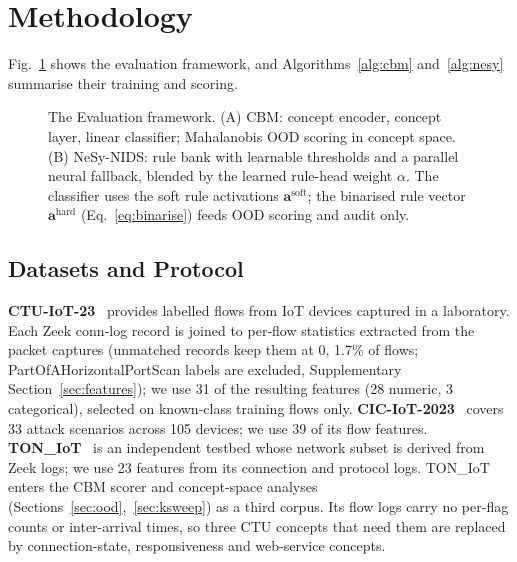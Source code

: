 \documentclass[journal]{IEEEtran}
\begin{document}
\section{Methodology}\label{sec:method}

Fig.~\ref{fig:arch} shows the evaluation framework, and Algorithms~\ref{alg:cbm} and~\ref{alg:nesy} summarise their training and scoring.

\begin{figure}[t]
    \centering
    \vspace{-1mm}
    \def\svgwidth{.85\textwidth}
    \fontsize{5}{5}\selectfont
    
    \vspace{-1mm}
    \caption{The Evaluation framework. (A) CBM: concept encoder, concept layer, linear classifier; Mahalanobis OOD scoring in concept space. (B) NeSy-NIDS: rule bank with learnable thresholds and a parallel neural fallback, blended by the learned rule-head weight $\alpha$. The classifier uses the soft rule activations $\mathbf{a}^{\mathrm{soft}}$; the binarised rule vector $\mathbf{a}^{\mathrm{hard}}$ (Eq.~\ref{eq:binarise}) feeds OOD scoring and audit only.}
    \label{fig:arch}
    \vspace{-2mm}
\end{figure}

\subsection{Datasets and Protocol}
\label{sec:datasets}

\textbf{CTU-IoT-23}~\cite{parmisano2020ctu} provides labelled flows from IoT devices captured in a laboratory. Each Zeek conn-log record is joined to per-flow statistics extracted from the packet captures (unmatched records keep them at 0, 1.7\% of flows; PartOfAHorizontalPortScan labels are excluded, Supplementary Section~\ref{sec:features}); we use 31 of the resulting features (28 numeric, 3 categorical), selected on known-class training flows only. \textbf{CIC-IoT-2023}~\cite{neto2023ciciot} covers 33 attack scenarios across 105 devices; we use 39 of its flow features. \textbf{TON\_IoT}~\cite{alsaedi2020toniot} is an independent testbed whose network subset is derived from Zeek logs; we use 23 features from its connection and protocol logs. TON\_IoT enters the CBM scorer and concept-space analyses (Sections~\ref{sec:ood},~\ref{sec:ksweep}) as a third corpus. Its flow logs carry no per-flag counts or inter-arrival times, so three CTU concepts that need them are replaced by connection-state, responsiveness and web-service concepts.
\end{document}
